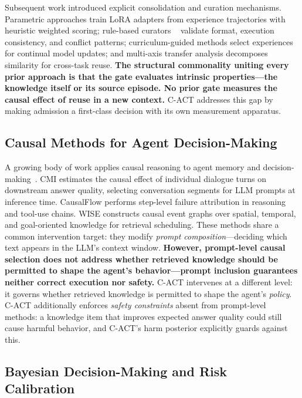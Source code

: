 \documentclass[letterpaper]{article}
\begin{document}
Subsequent work introduced explicit consolidation and curation mechanisms. Parametric approaches train LoRA adapters from experience trajectories with heuristic weighted scoring; rule-based curators ~\cite{mineevolve2026} validate format, execution consistency, and conflict patterns; curriculum-guided methods select experiences for continual model updates; and multi-axis transfer analysis decomposes similarity for cross-task reuse. \textbf{The structural commonality uniting every prior approach is that the gate evaluates intrinsic properties---the knowledge itself or its source episode. No prior gate measures the causal effect of reuse in a new context.} \textsc{C-ACT} addresses this gap by making admission a first-class decision with its own measurement apparatus.

\subsection{Causal Methods for Agent Decision-Making}

A growing body of work applies causal reasoning to agent memory and decision-making~\cite{cmi2026,causalflow2026,wise2026}. CMI estimates the causal effect of individual dialogue turns on downstream answer quality, selecting conversation segments for LLM prompts at inference time. CausalFlow performs step-level failure attribution in reasoning and tool-use chains. WISE constructs causal event graphs over spatial, temporal, and goal-oriented knowledge for retrieval scheduling. These methods share a common intervention target: they modify \emph{prompt composition}---deciding which text appears in the LLM's context window. \textbf{However, prompt-level causal selection does not address whether retrieved knowledge should be permitted to shape the agent's behavior---prompt inclusion guarantees neither correct execution nor safety.} \textsc{C-ACT} intervenes at a different level: it governs whether retrieved knowledge is permitted to shape the agent's \emph{policy}. \textsc{C-ACT} additionally enforces \emph{safety constraints} absent from prompt-level methods: a knowledge item that improves expected answer quality could still cause harmful behavior, and \textsc{C-ACT}'s harm posterior explicitly guards against this.

\subsection{Bayesian Decision-Making and Risk Calibration}
\end{document}
